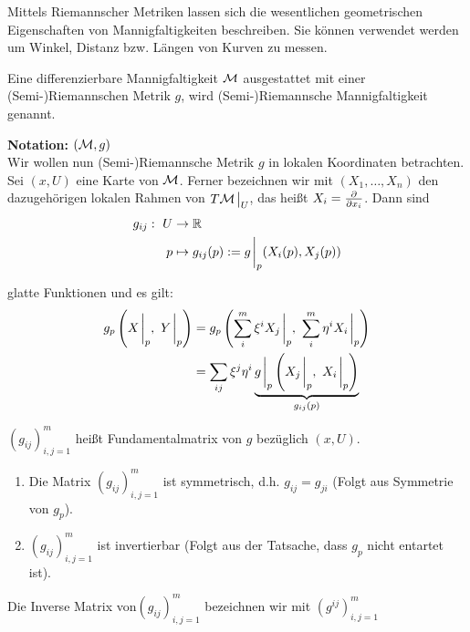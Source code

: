 
Mittels Riemannscher Metriken lassen sich die wesentlichen geometrischen Eigenschaften von Mannigfaltigkeiten beschreiben.
Sie können verwendet werden um Winkel, Distanz bzw. Längen von Kurven zu messen.

\begin{defs}
Eine differenzierbare Mannigfaltigkeit $\mathcal{M}$ ausgestattet mit einer (Semi-)Riemannschen Metrik $g$, wird (Semi-)Riemannsche Mannigfaltigkeit genannt.\\
\end{defs}
\textbf{Notation:} $(\mathcal{M}, g)$\\
Wir wollen nun (Semi-)Riemannsche Metrik $g$ in lokalen Koordinaten betrachten.
Sei $(x, U)$ eine Karte von $\mathcal{M}$.
Ferner bezeichnen wir mit $(X_1, \dots, X_n)$ den dazugehörigen lokalen Rahmen von $T\mfk \eval_U$,
das heißt $X_i = \pdv{x_i}$.
Dann sind 
\begin{align}
g_{ij} : \ U &\to \R \\
p & \mapsto g_{ij} (p) := g\eval_p (X_i (p), X_j (p))
\end{align}

glatte Funktionen und es gilt:
\begin{align}
g_p \left( X\eval_p, \ Y \eval_p \right) &= g_p \left( \sum_i^m \xi^i X_j \eval_p, \ \sum_i^m \eta^i X_i \eval_p \right) \\
&= \sum_{ij} \xi^j \eta^i \underbrace{g\eval_p \left( X_j \eval_p, \ X_i \eval_p\right) }_{g_{ij}(p)}
\end{align}

\begin{defs}[Fundamentalmatrix]
$(g_{ij})^m_{i, j = 1}$ heißt Fundamentalmatrix von $g$ bezüglich $(x, U)$.
\end{defs}

\begin{bem}\leavevmode
\begin{enumerate}
\item Die Matrix $(g_{ij})^m_{i, j = 1}$ ist symmetrisch, d.h. $g_{ij} = g_{ji}$ (Folgt aus Symmetrie von $g_p$).
\item $(g_{ij})^m_{i, j = 1}$ ist invertierbar (Folgt aus der Tatsache, dass $g_p$ nicht entartet ist).
\end{enumerate}
Die Inverse Matrix von$(g_{ij})^m_{i, j = 1}$ bezeichnen wir mit $(g^{ij})^m_{i, j = 1}$
\end{bem}

